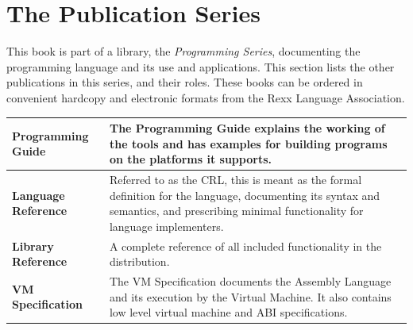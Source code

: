 \chapter{The \crexx{} Publication Series}
This book is part of a library, the \emph{\crexx{} Programming Series}, documenting the \crexx{} programming language and its use and applications. This section lists the other publications in this series, and their roles. These books can be ordered in convenient hardcopy and electronic formats from the Rexx Language Association.
\newline
\newline
\begin{tabularx}{\textwidth}{>{\bfseries}lX}
\toprule
Programming Guide & The Programming Guide
explains the working of the tools and has examples for building
programs on the platforms it supports.
\\\midrule
Language Reference & Referred to as the CRL, this is meant as the formal definition for the language, documenting its syntax and semantics, and prescribing minimal functionality for language implementers.
\\\midrule
Library Reference & A complete reference of all included functionality
in the \crexx{} distribution.
\\\midrule
VM Specification & The \crexx{} VM
Specification documents the \crexx{} Assembly Language and its execution
by the \crexx{} Virtual Machine. It also contains low level virtual
machine and ABI specifications.
\\\bottomrule
\end{tabularx}
